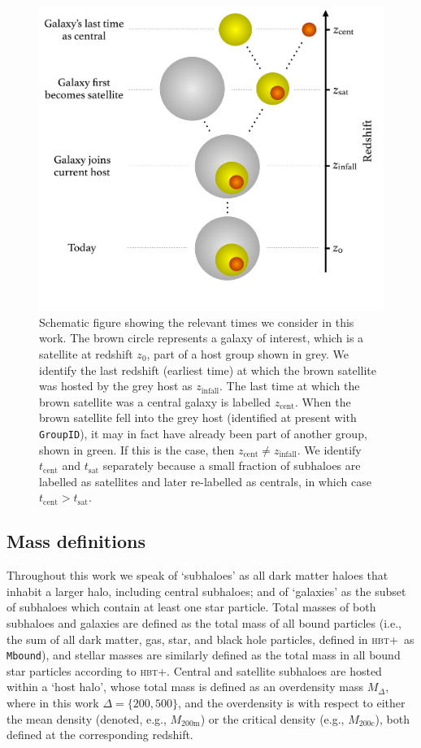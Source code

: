 \documentclass[usenatbib,fleqn]{mnras}
\newcommand{\hbt}{\textsc{hbt+}}
\newcommand{\mtwo}{M_\mathrm{200m}}
\newcommand{\mtwoc}{M_\mathrm{200c}}
\newcommand{\zcent}{z_\mathrm{cent}}
\newcommand{\zinfall}{z_\mathrm{infall}}
\begin{document}
\begin{figure}
  \centerline{\includegraphics[width=\linewidth]{history_chart.pdf}}
  \caption{Schematic figure showing the relevant times we consider in this work. The brown circle represents a galaxy of interest, 
which is a satellite at redshift $z_0$, part of a host group shown in grey. We identify the last redshift (earliest time) at which the brown
satellite was hosted by the grey host as $\zinfall$. The last time at which the brown satellite was a central galaxy is labelled
$\zcent$. When the brown satellite fell into the grey host (identified at present with \texttt{GroupID}), it may in fact have
already been part of another group, shown in green. If this is the case, then $\zcent \neq \zinfall$. We identify $t_\mathrm{cent}$ and $t_\mathrm{sat}$ separately because a small fraction of subhaloes are labelled as satellites and later re-labelled as centrals, in which case $t_\mathrm{cent} > t_\mathrm{sat}$.}
  \label{fig:chart}
\end{figure}


\subsection{Mass definitions}

Throughout this work we speak of `subhaloes' as all dark matter haloes that inhabit a larger halo, including central subhaloes; and of `galaxies' as the subset of subhaloes which contain at least one star particle. Total masses of both subhaloes and galaxies are  defined as the total mass of all bound particles (i.e., the sum of all dark matter, gas, star, and black hole particles, defined in \hbt\ as \texttt{Mbound}), and stellar masses are similarly defined as the total mass in all bound star particles according to \hbt. Central and satellite subhaloes are hosted within a `host halo', whose total mass is defined as an overdensity mass $M_\Delta$, where in this work $\Delta=\{200,500\}$, and the overdensity is with respect to either the mean density (denoted, e.g., $\mtwo$) or the critical density (e.g., $\mtwoc$), both defined at the corresponding redshift.
\end{document}
